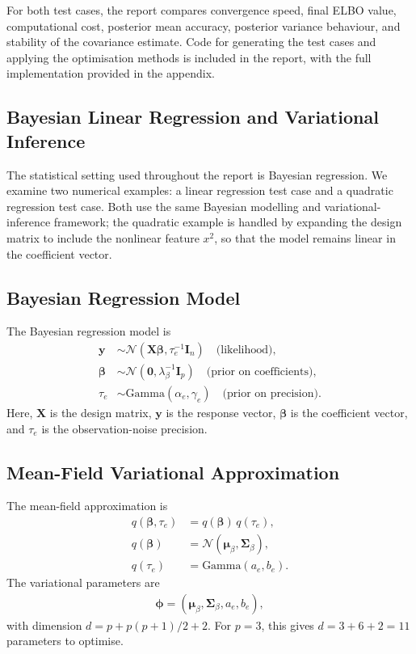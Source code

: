 \documentclass[11pt,a4paper]{article}
\newcommand{\N}{\mathcal{N}}
\begin{document}
For both test cases, the report compares convergence speed, final ELBO value, computational cost, posterior mean accuracy, posterior variance behaviour, and stability of the covariance estimate. Code for generating the test cases and applying the optimisation methods is included in the report, with the full implementation provided in the appendix.

\subsection{Bayesian Linear Regression and Variational Inference}

The statistical setting used throughout the report is Bayesian regression. We examine two numerical examples: a linear regression test case and a quadratic regression test case. Both use the same Bayesian modelling and variational-inference framework; the quadratic example is handled by expanding the design matrix to include the nonlinear feature $x^2$, so that the model remains linear in the coefficient vector.

\subsection{Bayesian Regression Model}

The Bayesian regression model is
\begin{align}
\bm{y} &\sim \N(\bm{X}\bm{\beta}, \tau_e^{-1} \bm{I}_n) \quad \text{(likelihood)},\\
\bm{\beta} &\sim \N(\bm{0}, \lambda_\beta^{-1} \bm{I}_p) \quad \text{(prior on coefficients)},\\
\tau_e &\sim \text{Gamma}(\alpha_e, \gamma_e) \quad \text{(prior on precision)}.
\end{align}
Here, $\bm{X}$ is the design matrix, $\bm{y}$ is the response vector, $\bm{\beta}$ is the coefficient vector, and $\tau_e$ is the observation-noise precision.

\subsection{Mean-Field Variational Approximation}

The mean-field approximation is
\begin{align}
q(\bm{\beta}, \tau_e) &= q(\bm{\beta})\,q(\tau_e),\\
q(\bm{\beta}) &= \N(\bm{\mu}_\beta, \bm{\Sigma}_\beta),\\
q(\tau_e) &= \text{Gamma}(a_e, b_e).
\end{align}
The variational parameters are
\begin{align}
\bm{\phi} = (\bm{\mu}_\beta,\bm{\Sigma}_\beta,a_e,b_e),
\end{align}
with dimension $d=p+p(p+1)/2+2$. For $p=3$, this gives $d=3+6+2=11$ parameters to optimise.
\end{document}

